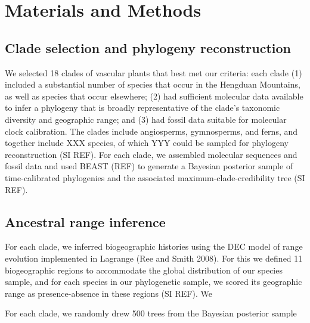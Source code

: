 \section{Materials and Methods}

\subsection{Clade selection and phylogeny reconstruction}

We selected 18 clades of vascular plants that best met our criteria: each clade (1) included a substantial number of species that occur in the Hengduan Mountains, as well as species that occur elsewhere; (2) had sufficient molecular data available to infer a phylogeny that is broadly representative of the clade's taxonomic diversity and geographic range; and (3) had fossil data suitable for molecular clock calibration. The clades include angiosperms, gymnosperms, and ferns, and together include XXX species, of which YYY could be sampled for phylogeny reconstruction (SI REF). For each clade, we assembled molecular sequences and fossil data and used BEAST (REF) to generate a Bayesian posterior sample of time-calibrated phylogenies and the associated maximum-clade-credibility tree (SI REF).

\subsection{Ancestral range inference}

For each clade, we inferred biogeographic histories using the DEC model of range evolution implemented in Lagrange (Ree and Smith 2008). For this we defined 11 biogeographic regions to accommodate the global distribution of our species sample, and for each species in our phylogenetic sample, we scored its geographic range as presence-absence in these regions (SI REF). We 

For each clade, we randomly drew 500 trees from the Bayesian posterior sample